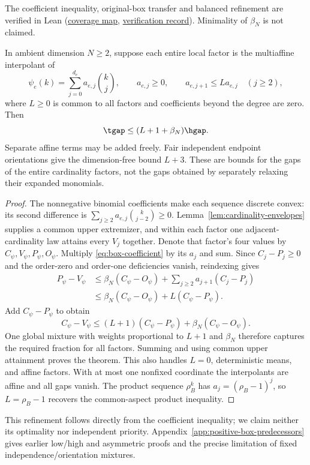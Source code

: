 The coefficient inequality, original-box transfer and balanced refinement
are verified in Lean
(\href{../formal/topics/18-positive-box/COVERAGE.md}{coverage map},
\href{../formal/topics/18-positive-box/VERIFICATION.md}{verification record}).
Minimality of $\beta_N$ is not claimed.

\begin{theorem}
\label{thm:coefficient-regularity}
In ambient dimension $N\ge2$, suppose each entire local factor is the
multiaffine interpolant of
\[
 \psi_e(k)=\sum_{j=0}^{d_e}a_{e,j}\binom kj,\qquad a_{e,j}\ge0,
 \qquad a_{e,j+1}\le L a_{e,j}\quad(j\ge2),
\]
where $L\ge0$ is common to all factors and coefficients beyond the
degree are zero. Then
\[
 \tgap\le(L+1+\beta_N)\hgap.
\]
Separate affine terms may be added freely. Fair independent endpoint
orientations give the dimension-free bound $L+3$. These are bounds
for the gaps of the entire cardinality factors, not the gaps obtained
by separately relaxing their expanded monomials.
\end{theorem}
\begin{proof}
The nonnegative binomial coefficients make each sequence discrete convex:
its second difference is $\sum_{j\ge2}a_{e,j}\binom{k}{j-2}\ge0$.
Lemma~\ref{lem:cardinality-envelopes} supplies a common upper extremizer,
and within each factor one adjacent-cardinality law attains every
$V_j$ together. Denote that factor's four values by $C_\psi,V_\psi,
P_\psi,O_\psi$. Multiply \eqref{eq:box-coefficient} by its $a_j$ and
sum. Since $C_j-P_j\ge0$ and the order-zero and order-one deficiencies
vanish, reindexing gives
\[
 \begin{split}
 P_\psi-V_\psi
 &\le\beta_N(C_\psi-O_\psi)
          +\sum_{j\ge2}a_{j+1}(C_j-P_j)\\
 &\le\beta_N(C_\psi-O_\psi)+L(C_\psi-P_\psi).
 \end{split}
\]
Add $C_\psi-P_\psi$ to obtain
\[
 C_\psi-V_\psi\le(L+1)(C_\psi-P_\psi)+\beta_N(C_\psi-O_\psi).
\]
One global mixture with weights proportional to $L+1$ and $\beta_N$
therefore captures the required fraction for all factors. Summing
and using common upper attainment proves the theorem. This also
handles $L=0$, deterministic means, and affine factors. With at most
one nonfixed coordinate the interpolants are affine and all gaps vanish.
The product sequence $\rho_B^k$ has $a_j=(\rho_B-1)^j$, so
$L=\rho_B-1$ recovers the common-aspect product inequality.
\end{proof}
This refinement follows directly from the coefficient inequality; we
claim neither its optimality nor independent priority.
Appendix~\ref{app:positive-box-predecessors} gives earlier low/high and
asymmetric proofs and the precise limitation of fixed
independence/orientation mixtures.


